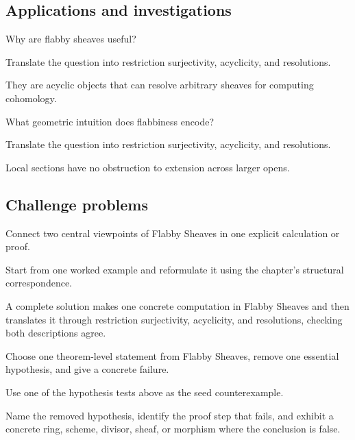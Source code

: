 \subsection*{Applications and investigations}

\begin{exercise}\label{exr:vi46-expand-13}
Why are flabby sheaves useful?
\end{exercise}
\begin{hint}
Translate the question into restriction surjectivity, acyclicity, and resolutions.
\end{hint}
\begin{solution}
They are acyclic objects that can resolve arbitrary sheaves for computing cohomology.
\end{solution}

\begin{exercise}\label{exr:vi46-expand-14}
What geometric intuition does flabbiness encode?
\end{exercise}
\begin{hint}
Translate the question into restriction surjectivity, acyclicity, and resolutions.
\end{hint}
\begin{solution}
Local sections have no obstruction to extension across larger opens.
\end{solution}

\subsection*{Challenge problems}

\begin{exercise}\label{exr:vi46-expand-15}
Connect two central viewpoints of Flabby Sheaves in one explicit calculation or proof.
\end{exercise}
\begin{hint}
Start from one worked example and reformulate it using the chapter's structural correspondence.
\end{hint}
\begin{solution}
A complete solution makes one concrete computation in Flabby Sheaves and then translates it through restriction surjectivity, acyclicity, and resolutions, checking both descriptions agree.
\end{solution}

\begin{exercise}\label{exr:vi46-expand-16}
Choose one theorem-level statement from Flabby Sheaves, remove one essential hypothesis, and give a concrete failure.
\end{exercise}
\begin{hint}
Use one of the hypothesis tests above as the seed counterexample.
\end{hint}
\begin{solution}
Name the removed hypothesis, identify the proof step that fails, and exhibit a concrete ring, scheme, divisor, sheaf, or morphism where the conclusion is false.
\end{solution}

